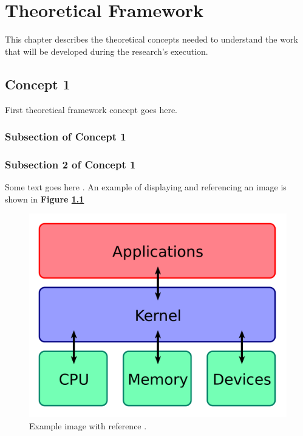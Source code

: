 \chapter{Theoretical Framework}
\label{chapter:theoretical-framework}


This chapter describes the theoretical concepts needed to understand the work that will be developed during the research's execution.


\section{Concept 1}

\label{section:Concept1}

First theoretical framework concept goes here.

\subsection{Subsection of Concept 1} 
\subsection{Subsection 2 of Concept 1}
Some text goes here \cite{examplereference}. An example of displaying and referencing an image is shown in \textbf{Figure \ref{fig:example}}


\begin{figure}
	\begin{center}
		\includegraphics[width=1\columnwidth]{../img/image.png}
		\caption[]{Example image with reference \cite{examplereference}.}
		\label{fig:example}
	\end{center}
\end{figure}



